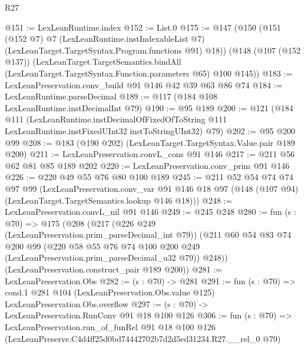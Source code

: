 \begin{lexlean}{R27}
\begin{coremodule}
@151 := LexLeanRuntime.index
@152 := List.{0}
@175 := @147
    (@150
      (@151
        (@152 @7)
        @7
        (LexLeanRuntime.instIndexableList @7)
        (LexLeanTarget.TargetSyntax.Program.functions @91)
        @18))
    (@148
      (@107 (@152 @137))
      (LexLeanTarget.TargetSemantics.bindAll
        (LexLeanTarget.TargetSyntax.Function.parameters @65)
        @100
        @145))
@183 := LexLeanPreservation.conv_build @91 @146 @42 @39 @63 @86 @74
@184 := LexLeanRuntime.parseDecimal
@189 := @117 (@184 @108 LexLeanRuntime.instDecimalInt @79)
@190 := @95 @189
@200 := @121
    (@184
      @111
      (LexLeanRuntime.instDecimalOfFixedOfToString
        @111
        LexLeanRuntime.instFixedUInt32
        instToStringUInt32)
      @79)
@202 := @95 @200 @99
@208 := @183 (@190 @202) (LexLeanTarget.TargetSyntax.Value.pair @189 @200)
@211 := LexLeanPreservation.convL_cons @91 @146
@217 := @211 @56 @62 @81 @85 @189 @202
@220 := LexLeanPreservation.conv_prim @91 @146
@226 := @220 @49 @55 @76 @80 @100 @189
@245 := @211
    @52
    @54
    @74
    @74
    @97
    @99
    (LexLeanPreservation.conv_var
      @91
      @146
      @18
      @97
      (@148 (@107 @94) (LexLeanTarget.TargetSemantics.lookup @146 @18)))
@248 := LexLeanPreservation.convL_nil @91 @146
@249 := @245 @248
@280 := fun (s : @70) =>
  @175
    (@208
      (@217
        (@226 @249 (LexLeanPreservation.prim_parseDecimal_int @79))
        (@211
          @60
          @54
          @83
          @74
          @200
          @99
          (@220 @58 @55 @76 @74 @100 @200 @249 (LexLeanPreservation.prim_parseDecimal_u32 @79))
          @248))
      (LexLeanPreservation.construct_pair @189 @200))
@281 := LexLeanPreservation.Obs
@282 := (s : @70) -> @281
@291 := fun (s : @70) =>
  cond.{1} @281 @104 (LexLeanPreservation.Obs.value @125) LexLeanPreservation.Obs.overflow
@297 := (s : @70) -> LexLeanPreservation.RunConv @91 @18 @100 @126
@306 := fun (s : @70) =>
  LexLeanPreservation.run_of_funRel
    @91
    @18
    @100
    @126
    (LexLeanPreserve.C4d4ff25d0bd74442702b7d2d5ed31234.R27.__rel_0 @79)
\end{coremodule}
\end{lexlean}
